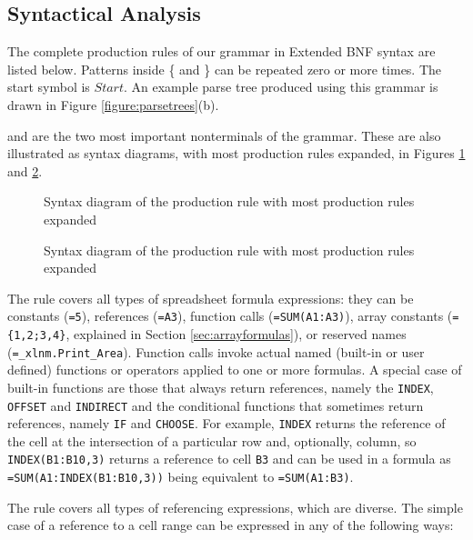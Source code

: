 \documentclass[times]{smrauth}
\begin{document}
\subsection{Syntactical Analysis}
\label{subsection:productionRules}

The complete production rules of our grammar in Extended BNF syntax are listed below.
Patterns inside \{ and \} can be repeated zero or more times.
The start symbol is $Start$. An example parse tree produced using this grammar is drawn in Figure \ref{figure:parsetrees}(b).



 and  are the two most important nonterminals of the grammar.
These are also illustrated as syntax diagrams, with most production rules expanded, in Figures \ref{figure:Formula} and \ref{figure:Reference}.

\begin{figure}[]
	
	\caption{Syntax diagram of the  production rule with most production rules expanded}
	\label{figure:Formula}
\end{figure}

\begin{figure}[]
	\centering
	
	\caption{Syntax diagram of the  production rule with most production rules expanded}
	\label{figure:Reference}
\end{figure}

The  rule covers all types of spreadsheet formula expressions: they can be constants (\texttt{=5}), references (\texttt{=A3}), function calls (\texttt{=SUM(A1:A3)}), array constants (\texttt{=\{1,2;3,4\}}, explained in Section \ref{sec:arrayformulas}), or reserved names (\texttt{=_xlnm.Print_Area}). Function calls invoke actual named (built-in or user defined) functions or operators applied to one or more formulas. A special case of built-in functions are those that always return references, namely the \texttt{INDEX}, \texttt{OFFSET} and \texttt{INDIRECT} and the conditional functions that sometimes return references, namely \texttt{IF} and \texttt{CHOOSE}.
For example, \texttt{INDEX} returns the reference of the cell at the intersection of a particular row and, optionally, column, so \texttt{INDEX(B1:B10,3)} returns a reference to cell \texttt{B3} and can be used in a formula as \texttt{=SUM(A1:INDEX(B1:B10,3))} being equivalent to \texttt{=SUM(A1:B3)}.

The  rule covers all types of referencing expressions, which are diverse. The simple case of a reference to a cell range can be expressed in any of the following ways:
\end{document}
